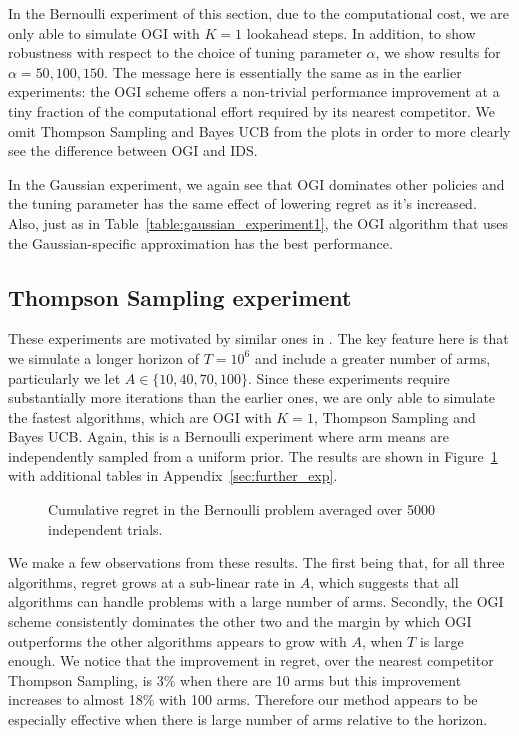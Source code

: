 In the Bernoulli experiment of this section, due to the computational cost, we are only able to simulate OGI with $K = 1$ lookahead steps. In addition, to show robustness with respect to the choice of tuning parameter $\alpha$, we show results for $\alpha = 50,100,150$. The message here is essentially the same as in the earlier experiments: the OGI scheme offers a non-trivial performance improvement at a tiny fraction of the computational effort required by its nearest competitor. We omit Thompson Sampling and Bayes UCB from the plots in order to more clearly see the difference between OGI and IDS.

In the Gaussian experiment, we again see that OGI dominates other policies and the tuning parameter has the same effect of lowering regret as it's increased. Also, just as in Table~\ref{table:gaussian_experiment1}, the OGI algorithm that uses the Gaussian-specific approximation has the best performance. 

\subsection{Thompson Sampling experiment} \label{exp:ts_sampling_experiment}
These experiments are motivated by similar ones in \cite{chapelle2011empirical}. The key feature here is that we simulate a longer horizon of $T = 10^6$ and include a greater number of arms, particularly we let $A \in \{10,40,70,100\}$. Since these experiments require substantially more iterations than the earlier ones, we are only able to simulate the fastest algorithms, which are OGI with $K=1$, Thompson Sampling and Bayes UCB. Again, this is a Bernoulli experiment where arm means are independently sampled from a uniform prior. The results are shown in Figure~\ref{fig:chapelle_and_li} with additional tables in Appendix~\ref{sec:further_exp}.
\begin{figure}
	\centering
	
	\caption{Cumulative regret in the Bernoulli problem averaged over 5000 independent trials.}
	\label{fig:chapelle_and_li}
\end{figure}

We make a few observations from these results. The first being that, for all three algorithms, regret grows at a sub-linear rate in $A$, which suggests that all algorithms can handle problems with a large number of arms. Secondly, the OGI scheme consistently dominates the other two and the margin by which OGI outperforms the other algorithms appears to grow with $A$, when $T$ is large enough. We notice that the improvement in regret, over the nearest competitor Thompson Sampling, is 3\% when there are 10 arms but this improvement increases to almost 18\% with 100 arms. Therefore our method appears to be especially effective when there is large number of arms relative to the horizon.

